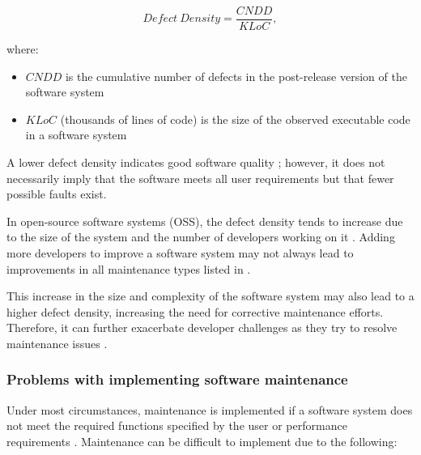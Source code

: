 \begin{equation}
	\label{eq:ch1_defectDensity}
	Defect~Density = \frac{CNDD}{KLoC},
\end{equation}

where:

\begin{itemize}
	\item $CNDD$ is the cumulative number of defects in the post-release version of the software system
	\item $KLoC$ (thousands of lines of code) is the size of the observed executable code in a software system 
\end{itemize}

A lower defect density indicates good software quality \cite{Shah2012, Alenezi2016}; however, it does not necessarily imply that the software meets all user requirements but that fewer possible faults exist.\par In open-source software systems (OSS), the defect density tends to increase due to the size of the system and the number of developers working on it \cite{Rahmani2010}. Adding more developers to improve a software system may not always lead to improvements in all maintenance types listed in .\par This increase in the size and complexity of the software system may also lead to a higher defect density, increasing the need for corrective maintenance efforts. Therefore, it can further exacerbate developer challenges as they try to resolve maintenance issues \cite{Alenezi2016}.

\subsubsection{Problems with implementing software maintenance}\label{sec:ch1_maintenanceProblems}
Under most circumstances, maintenance is implemented if a software system does not meet the required functions specified by the user or performance requirements \cite{Ogheneovo2014, Sneed2004}. Maintenance can be difficult to implement due to the following:

